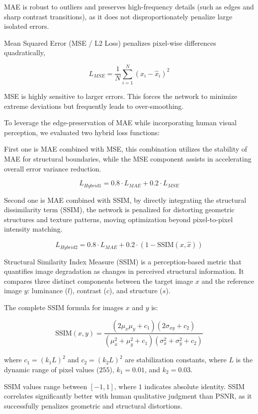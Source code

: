 \documentclass[conference]{IEEEtran}
\begin{document}
MAE is robust to outliers and preserves high-frequency details (such as edges and sharp contrast transitions),
as it does not disproportionately penalize large isolated errors.\cite{zhao2016loss}

Mean Squared Error (MSE / L2 Loss) penalizes pixel-wise differences quadratically,

$$
L_{MSE} = \frac{1}{N} \sum_{i=1}^{N} (x_i - \hat{x}_i)^2
$$

MSE is highly sensitive to larger errors. This forces the network to minimize extreme deviations but frequently leads to over-smoothing.\cite{zhao2016loss}

To leverage the edge-preservation of MAE while incorporating human visual perception,
we evaluated two hybrid loss functions:

First one is MAE combined with MSE, this combination utilizes the stability of MAE for structural boundaries,
while the MSE component assists in accelerating overall error variance reduction.

$$
L_{Hybrid1} = 0.8 \cdot L_{MAE} + 0.2 \cdot L_{MSE}
$$

Second one is MAE combined with SSIM, by directly integrating the structural dissimilarity term ($\text{SSIM}$),
the network is penalized for distorting geometric structures and texture patterns,
moving optimization beyond pixel-to-pixel intensity matching.

$$
L_{Hybrid2} = 0.8 \cdot L_{MAE} + 0.2 \cdot (1 - \text{SSIM}(x, \hat{x}))
$$

Structural Similarity Index Measure (SSIM) is a perception-based metric that quantifies image degradation as changes in perceived structural information.
It compares three distinct components between the target image $x$ and the reference image $y$:
luminance ($l$), contrast ($c$), and structure ($s$).\cite{wang2004image}

The complete SSIM formula for images $x$ and $y$ is:

$$
\text{SSIM}(x, y) = \frac{(2\mu_x\mu_y + c_1)(2\sigma_{xy} + c_2)}{(\mu_x^2 + \mu_y^2 + c_1)(\sigma_x^2 + \sigma_y^2 + c_2)}
$$

where $c_1 = (k_1 L)^2$ and $c_2 = (k_2 L)^2$ are stabilization constants, where $L$ is the dynamic range of pixel values ($255$), $k_1 = 0.01$, and $k_2 = 0.03$.

SSIM values range between $[-1, 1]$, where $1$ indicates absolute identity.
SSIM correlates significantly better with human qualitative judgment than PSNR,
as it successfully penalizes geometric and structural distortions.
\end{document}
